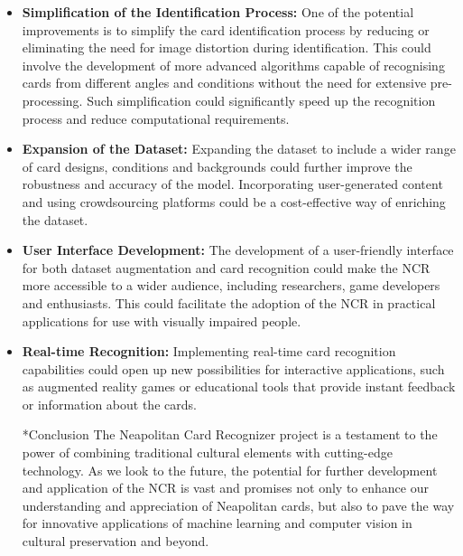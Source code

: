 \documentclass[twocolumn, a4paper,10pt]{article}
\makeatletter
\renewcommand\subsection{\@startsection{subsection}{1}{\z@}{\z@}{\z@}{\normalfont\normalsize\bfseries}}
\renewcommand\subsection{\@startsection{subsection}{1}{\z@}{\z@}{0.1pt}{\normalfont\normalsize\bfseries}}
\makeatother
\begin{document}
\begin{itemize}
  
  \item \textbf{Simplification of the Identification Process:} One of the potential improvements is to simplify the card identification process by reducing or eliminating the need for image distortion during identification. This could involve the development of more advanced algorithms capable of recognising cards from different angles and conditions without the need for extensive pre-processing. Such simplification could significantly speed up the recognition process and reduce computational requirements.

  \item \textbf{Expansion of the Dataset:} Expanding the dataset to include a wider range of card designs, conditions and backgrounds could further improve the robustness and accuracy of the model. Incorporating user-generated content and using crowdsourcing platforms could be a cost-effective way of enriching the dataset.

  \item \textbf{User Interface Development:} The development of a user-friendly interface for both dataset augmentation and card recognition could make the NCR more accessible to a wider audience, including researchers, game developers and enthusiasts. This could facilitate the adoption of the NCR in practical applications for use with visually impaired people.

  \item \textbf{Real-time Recognition:} Implementing real-time card recognition capabilities could open up new possibilities for interactive applications, such as augmented reality games or educational tools that provide instant feedback or information about the cards.

  \subsection*{Conclusion}   
  The Neapolitan Card Recognizer project is a testament to the power of combining traditional cultural elements with cutting-edge technology. As we look to the future, the potential for further development and application of the NCR is vast and promises not only to enhance our understanding and appreciation of Neapolitan cards, but also to pave the way for innovative applications of machine learning and computer vision in cultural preservation and beyond.
\end{itemize}
\nocite{*}


\newpage
\onecolumn
\end{document}
